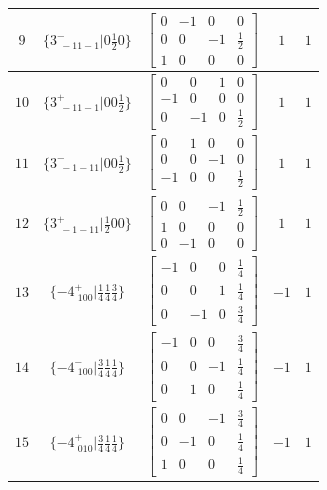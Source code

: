 \documentclass[fleqn,8pt]{jsarticle}
\begin{document}
\begin{longtable}{ccccc}
$ 9 $ & $ \{3^{-}_{\,\,-11-1}|0 \frac{1}{2} 0\} $ & $ \begin{bmatrix} 0 & -1 & 0 & 0 \\ 0 & 0 & -1 & \frac{1}{2} \\ 1 & 0 & 0 & 0 \end{bmatrix} $ & $ 1 $ & $ 1 $ \\ \hline
$ 10 $ & $ \{3^{+}_{\,\,-11-1}|0 0 \frac{1}{2}\} $ & $ \begin{bmatrix} 0 & 0 & 1 & 0 \\ -1 & 0 & 0 & 0 \\ 0 & -1 & 0 & \frac{1}{2} \end{bmatrix} $ & $ 1 $ & $ 1 $ \\ \hline
$ 11 $ & $ \{3^{-}_{\,\,-1-11}|0 0 \frac{1}{2}\} $ & $ \begin{bmatrix} 0 & 1 & 0 & 0 \\ 0 & 0 & -1 & 0 \\ -1 & 0 & 0 & \frac{1}{2} \end{bmatrix} $ & $ 1 $ & $ 1 $ \\ \hline
$ 12 $ & $ \{3^{+}_{\,\,-1-11}|\frac{1}{2} 0 0\} $ & $ \begin{bmatrix} 0 & 0 & -1 & \frac{1}{2} \\ 1 & 0 & 0 & 0 \\ 0 & -1 & 0 & 0 \end{bmatrix} $ & $ 1 $ & $ 1 $ \\ \hline
$ 13 $ & $ \{-4^{+}_{\,\,100}|\frac{1}{4} \frac{1}{4} \frac{3}{4}\} $ & $ \begin{bmatrix} -1 & 0 & 0 & \frac{1}{4} \\ 0 & 0 & 1 & \frac{1}{4} \\ 0 & -1 & 0 & \frac{3}{4} \end{bmatrix} $ & $ -1 $ & $ 1 $ \\ \hline
$ 14 $ & $ \{-4^{-}_{\,\,100}|\frac{3}{4} \frac{1}{4} \frac{1}{4}\} $ & $ \begin{bmatrix} -1 & 0 & 0 & \frac{3}{4} \\ 0 & 0 & -1 & \frac{1}{4} \\ 0 & 1 & 0 & \frac{1}{4} \end{bmatrix} $ & $ -1 $ & $ 1 $ \\ \hline
$ 15 $ & $ \{-4^{+}_{\,\,010}|\frac{3}{4} \frac{1}{4} \frac{1}{4}\} $ & $ \begin{bmatrix} 0 & 0 & -1 & \frac{3}{4} \\ 0 & -1 & 0 & \frac{1}{4} \\ 1 & 0 & 0 & \frac{1}{4} \end{bmatrix} $ & $ -1 $ & $ 1 $ \\ \hline

\end{longtable}
\end{document}
